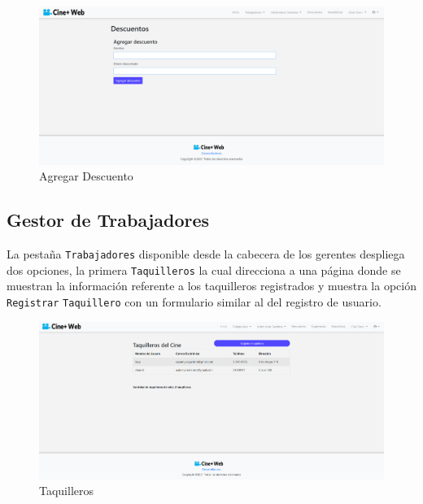 \begin{figure}[h!]
	\centering
	\includegraphics[scale=0.35]{./chapters/img/add_discount.png}
	
	\label{fig:add_discount}
	\caption{Agregar Descuento}
	
\end{figure}



\subsection{Gestor de Trabajadores}
La pesta\~na \verb*|Trabajadores| disponible desde la cabecera de los gerentes despliega dos opciones, la primera \verb*|Taquilleros| la cual direcciona a una p\'agina donde se muestran la informaci\'on referente a los taquilleros registrados y muestra la opci\'on \verb*|Registrar|  \verb*|Taquillero| con un formulario similar al del registro de usuario.

\begin{figure}[h!]
	\centering
	\includegraphics[scale=0.35]{./chapters/img/ver_taquilleros.png}
	
	\label{fig:ver_taquilleros}
	\caption{Taquilleros}
	
\end{figure}

